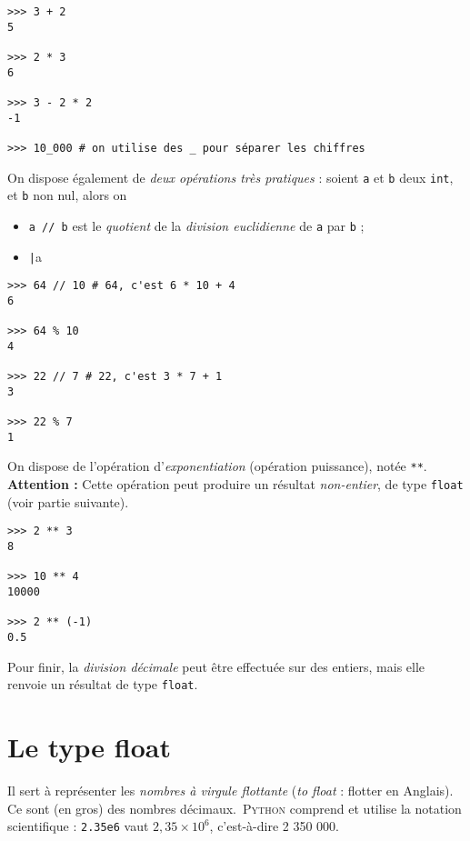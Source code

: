 \begin{pyc}\begin{verbatim}
>>> 3 + 2
5

>>> 2 * 3
6

>>> 3 - 2 * 2
-1

>>> 10_000 # on utilise des _ pour séparer les chiffres
\end{verbatim}
\end{pyc}

On dispose également de \textit{deux opérations très pratiques} : soient \texttt{a} et \texttt{b} deux \texttt{int}, et \texttt{b} non nul, alors on 
\begin{itemize}
  \item \texttt{a // b} est le \textit{quotient} de la \textit{division euclidienne} de \texttt{a} par \texttt{b} ;  
  \item \texttt|a %
\end{itemize}


\begin{pyc}\begin{verbatim}
>>> 64 // 10 # 64, c'est 6 * 10 + 4
6

>>> 64 % 10
4

>>> 22 // 7 # 22, c'est 3 * 7 + 1
3

>>> 22 % 7
1
\end{verbatim}
\end{pyc}


On dispose de l'opération d'\textit{exponentiation} (opération puissance), notée \texttt{**}.\\
\textbf{Attention :} Cette opération peut produire un résultat \textit{non-entier}, de type \texttt{float} (voir partie suivante).

\begin{pyc}\begin{verbatim}
>>> 2 ** 3
8

>>> 10 ** 4
10000

>>> 2 ** (-1)
0.5
\end{verbatim}
\end{pyc}

Pour finir, la \textit{division décimale} peut être effectuée sur des entiers, mais elle renvoie un résultat de type \texttt{float}.

\section{Le type float}
Il sert à représenter les \textit{nombres à virgule flottante} (\textit{to float} : flotter en Anglais). Ce sont (en gros) des nombres
décimaux.\ \textsc{Python} comprend et utilise la notation scientifique : \texttt{2.35e6} vaut $2,35\times 10^6$, c'est-à-dire 2 350 000.

